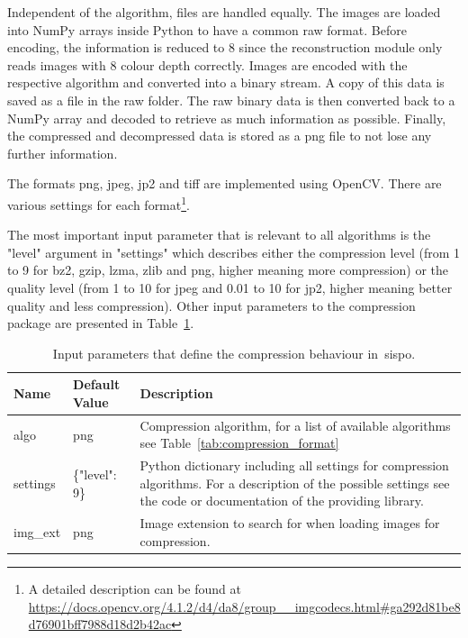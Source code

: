 Independent of the algorithm, files are handled equally. The images are loaded into NumPy arrays inside Python to have a common raw format. Before encoding, the information is reduced to \SI{8}{\bit} since the reconstruction module only reads images with \SI{8}{\bit} colour depth correctly. Images are encoded with the respective algorithm and converted into a binary stream. A copy of this data is saved as a file in the raw folder. The raw binary data is then converted back to a NumPy array and decoded to retrieve as much information as possible. Finally, the compressed and decompressed data is stored as a \gls{png} file to not lose any further information.

The formats \gls{png}, \gls{jpeg}, \gls{jp2} and tiff are implemented using OpenCV. There are various settings for each format\footnote{A detailed description can be found at \url{https://docs.opencv.org/4.1.2/d4/da8/group__imgcodecs.html\#ga292d81be8d76901bff7988d18d2b42ac}}.

The most important input parameter that is relevant to all algorithms is the "level" argument in "settings" which describes either the compression level (from 1 to 9 for bz2, gzip, \gls{lzma}, zlib and \gls{png}, higher meaning more compression) or the quality level (from 1 to 10 for \gls{jpeg} and 0.01 to 10 for \gls{jp2}, higher meaning better quality and less compression). Other input parameters to the compression package are presented in Table~\ref{tab:compression_settings}.

\begin{table}[htb]
    \centering
    \caption{Input parameters that define the compression behaviour in~\gls{sispo}.}
    \label{tab:compression_settings}
    \begin{tabular}{p{}|p{}|p{}}
        \textbf{Name} & \textbf{Default Value} & \textbf{Description} \\ \hline
        algo    & \gls{png}          & Compression algorithm, for a list of available algorithms see Table~\ref{tab:compression_format}\\
        settings    & \{"level": 9\} & Python dictionary including all settings for compression algorithms. For a description of the possible settings see the code or documentation of the providing library. \\
        img\_ext    & \gls{png}          & Image extension to search for when loading images for compression. 
    \end{tabular}
\end{table}

